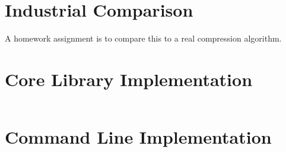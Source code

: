\documentclass{scrartcl}
\begin{document}
\section{Industrial Comparison}
A homework assignment is to compare this to a real compression algorithm.
\appendix
\section{Core Library Implementation}
\inputminted[fontsize=\small,linenos=true]{C}{lzw.c}
\section{Command Line Implementation}
\inputminted[fontsize=\small,linenos=true]{C}{lzw_main.c}
\end{document}
